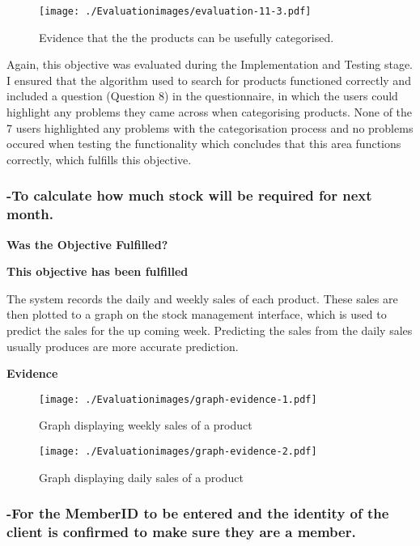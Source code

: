 \begin{figure}[H]
\caption{Evidence that the the products can be usefully categorised.} \label{fig:evaluation-11-3}
\hfill\texttt{[image: ./Evaluationimages/evaluation-11-3.pdf]}
\end{figure}

Again, this objective was evaluated during the Implementation and Testing stage. I ensured that the algorithm used to search for products functioned correctly and included a question (Question 8) in the questionnaire, in which the users could highlight any problems they came across when categorising products. None of the 7 users highlighted any problems with the categorisation process and no problems occured when testing the functionality which concludes that this area functions correctly, which fulfills this objective.




\pagebreak
\subsubsection{-To calculate how much stock will be required for next month.}
\label{stock-eval}
\textbf{Was the Objective Fulfilled?} \newline

\textbf{\large{This objective has been fulfilled}}


The system records the daily and weekly sales of each product. These sales are then plotted to a graph on the stock management interface, which is used to predict the sales for the up coming week. Predicting the sales from the daily sales usually produces are more accurate prediction.

\textbf{Evidence} \newline

\begin{figure}[H]
\caption{Graph displaying weekly sales of a product} \label{fig:graph-evidence-1.pdf}
\hfill\texttt{[image: ./Evaluationimages/graph-evidence-1.pdf]}
\end{figure}

\begin{figure}[H]
\caption{Graph displaying daily sales of a product} \label{fig:graph-evidence-2.pdf}
\hfill\texttt{[image: ./Evaluationimages/graph-evidence-2.pdf]}
\end{figure}




\pagebreak
\subsubsection{-For the MemberID to be entered and the identity of the client is confirmed to make sure they are a member.}

